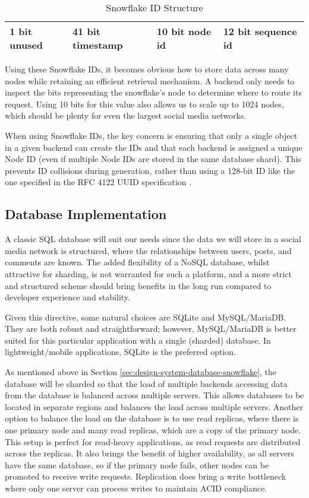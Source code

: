 \begin{table}[htbp]
\centering
\begin{tabular}{|l|l|l|l|}
\hline
1 bit unused & 41 bit timestamp & 10 bit node id & 12 bit sequence id \\ \hline
\end{tabular}
\caption{Snowflake ID Structure}
\label{tab:snowflake}
\end{table}

Using these Snowflake IDs, it becomes obvious how to store data across many nodes while retaining an efficient retrieval mechanism. A backend only needs to inspect the bits representing the snowflake's node to determine where to route its request. Using 10 bits for this value also allows us to scale up to 1024 nodes, which should be plenty for even the largest social media networks.

When using Snowflake IDs, the key concern is ensuring that only a single object in a given backend can create the IDs and that each backend is assigned a unique Node ID (even if multiple Node IDs are stored in the same database shard). 
This prevents ID collisions during generation, rather than using a 128-bit ID like the one specified in the RFC 4122 UUID specification \citep{rfc4122}.

\subsection{Database Implementation}
\label{sec:design-system-database-implementation}
A classic SQL database will suit our needs since the data we will store in a social media network is structured, where the relationships between users, posts, and comments are known.
The added flexibility of a NoSQL database, whilst attractive for sharding, is not warranted for such a platform, and a more strict and structured scheme should bring benefits in the long run compared to developer experience and stability.

Given this directive, some natural choices are SQLite and MySQL/MariaDB. They are both robust and straightforward; however, MySQL/MariaDB is better suited for this particular application with a single (sharded) database. In lightweight/mobile applications, SQLite is the preferred option.

As mentioned above in Section \ref{sec:design-system-database-snowflake}, the database will be sharded so that the load of multiple backends accessing data from the database is balanced across multiple servers. 
This allows databases to be located in separate regions and balances the load across multiple servers.
Another option to balance the load on the database is to use read replicas, where there is one primary node and many read replicas, which are a copy of the primary node.
This setup is perfect for read-heavy applications, as read requests are distributed across the replicas.
It also brings the benefit of higher availability, as all servers have the same database, so if the primary node fails, other nodes can be promoted to receive write requests.
Replication does bring a write bottleneck where only one server can process writes to maintain ACID compliance. 


